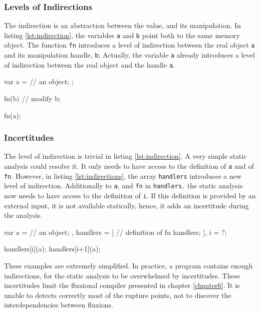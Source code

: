 \subsubsection{Levels of Indirections}

The indirection is an abstraction between the value, and its manipulation.
In listing \ref{lst:indirection}, the variables \texttt{a} and \texttt{b} point both to the same memory object.
The function \texttt{fn} introduces a level of indirection between the real object \texttt{a} and its manipulation handle, \texttt{b};
Actually, the variable \texttt{a} already introduces a level of indirection between the real object and the handle \texttt{a}.

\begin{code}[js,
  caption={One level of Indirection},
  label={lst:indirection}]
var a = {
      // an object;
    };

fn(b) {
  // modify b;
}

fn(a);
\end{code}

\subsubsection{Incertitudes}

The level of indirection is trivial in listing \ref{lst:indirection}.
A very simple static analysis could resolve it.
It only needs to have access to the definition of \texttt{a} and of \texttt{fn}.
However, in listing \ref{lst:indirections}, the array \texttt{handlers} introduces a new level of indirection.
Additionally to \texttt{a}, and \texttt{fn} in \texttt{handlers}, the static analysis now needs to have access to the definition of \texttt{i}.
If this definition is provided by an external input, it is not available statically, hence, it adds an incertitude during the analysis. 

\begin{code}[js,
  caption={Two levels of indirection},
  label={lst:indirections}]
var a = {
      // an object;
    },
    handlers = [
      // definition of fn handlers;
    ],
    i = ?;

handlers[i](a);
handlers[i+1](a);
\end{code}

These examples are extremely simplified.
In practice, a program contains enough indirections, for the static analysis to be overwhelmed by incertitudes.
These incertitudes limit the fluxional compiler presented in chapter \ref{chpater6}.
It is unable to detects correctly most of the rupture points, not to discover the interdependencies between fluxions.

